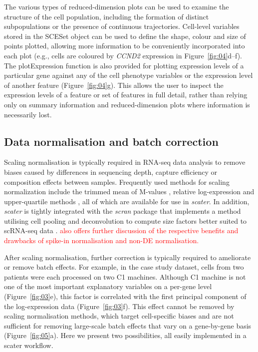 \documentclass{bioinfo}
\newcommand{\revised}[1]{\textcolor{red}{#1}}
\begin{document}
The various types of reduced-dimension plots can be used to examine the structure of the cell population, including the formation of distinct subpopulations or the presence of continuous trajectories. Cell-level variables stored in the
SCESet object can be used to define the shape, colour and size of points
plotted, allowing more information to be conveniently incorporated into
each plot (e.g., cells are coloured by \emph{CCND2} expression in
Figure~\ref{fig:04}d--f). The plotExpression function is also provided for
plotting expression levels of a particular gene against any of the cell
phenotype variables or the expression level of
another feature (Figure~\ref{fig:04}g). This allows the user to inspect the expression levels
of a feature or set of features in full detail, rather than relying only
on summary information and reduced-dimension plots where information is
necessarily lost.


\subsection{Data normalisation and batch correction} \label{data-normalisation-and-batch-correction}

Scaling normalisation is typically required in RNA-seq data analysis to remove biases caused by differences in sequencing depth, capture efficiency or composition effects between samples. Frequently used methods for scaling normalization include the trimmed mean of M-values \citep{Robinson2010-dy}, relative log-expression \citep{Anders2010-kv} and upper-quartile methods \citep{Bullard2010-ui}, all of which are available for use in \emph{scater}. In addition, \emph{scater} is tightly integrated with the \emph{scran} package that implements a method utilising cell pooling and deconvolution to compute size factors better suited to scRNA-seq data \citep{Lun2016-sk}. \revised{\citet{Lun2016-uj} also offers further discussion of the respective benefits and drawbacks of spike-in normalisation and non-DE normalisation.}

After scaling normalisation, further correction is typically required to ameliorate or remove batch effects. For example, in the case study dataset, cells from two patients were each processed on two C1 machines. Although C1 machine is not one of the most important explanatory variables on a per-gene level (Figure~\ref{fig:03}e), this factor is correlated with the first principal component of the log-expression data (Figure~\ref{fig:03}f). This effect cannot be removed by scaling normalisation methods, which target cell-specific biases and are not sufficient for removing large-scale batch effects that vary on a gene-by-gene basis (Figure~\ref{fig:05}a). Here we present two possibilities, all easily implemented in a scater workflow.
\end{document}
